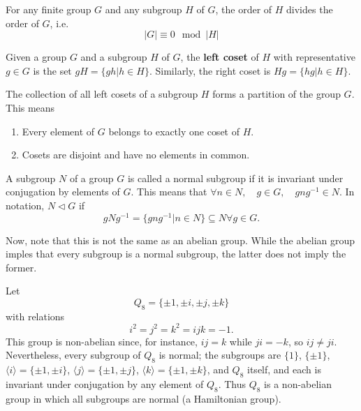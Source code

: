 \documentclass[12pt]{article}
\begin{document}
\begin{theorem}
    For any finite group $G$ and any subgroup $H$ of $G$, the order of $H$ divides the order of $G$, i.e. $$\vert G \vert \equiv 0 \mod \vert H \vert$$
\end{theorem}
\vspace{12pt}


\begin{definition}[Coset]
    Given a group $G$ and a subgroup $H$ of $G$, the \textbf{left coset} of $H$ with representative $g \in G$ is the set $gH = \{gh \vert h \in H\}$. Similarly, the right coset is $Hg = \{hg \vert h \in H\}$.
\end{definition}

\begin{theorem}
    The collection of all left cosets of a subgroup $H$ forms a partition of the group $G$. This means 
    \begin{enumerate}
        \item Every element of $G$ belongs to exactly one coset of $H$.
        \item Cosets are disjoint and have no elements in common.
    \end{enumerate}
\end{theorem}

\begin{definition}
    A subgroup $N$ of a group $G$ is called a normal subgroup if it is invariant under conjugation by elements of $G$. This means that $\forall n \in N, \quad g \in G, \quad gng^{-1} \in N$. In notation, $N \triangleleft G$ if $$gNg^{-1} = \{gng^{-1} \vert n \in N\} \subseteq N \forall g \in G.$$
\end{definition}

Now, note that this is not the same as an abelian group. While the abelian group imples that every subgroup is a normal subgroup, the latter does not imply the former.

\begin{example}
Let $$Q_8=\{\pm 1,\pm i,\pm j,\pm k\}$$ with relations $$i^2=j^2=k^2=ijk=-1.$$ This group is non-abelian since, for instance, $ij=k$ while $ji=-k$, so $ij\neq ji$. Nevertheless, every subgroup of $Q_8$ is normal; the subgroups are $\{1\}$, $\{\pm 1\}$, $\langle i\rangle=\{\pm 1,\pm i\}$, $\langle j\rangle=\{\pm 1,\pm j\}$, $\langle k\rangle=\{\pm 1,\pm k\}$, and $Q_8$ itself, and each is invariant under conjugation by any element of $Q_8$. Thus $Q_8$ is a non-abelian group in which all subgroups are normal (a Hamiltonian group).
\end{example}
\end{document}
